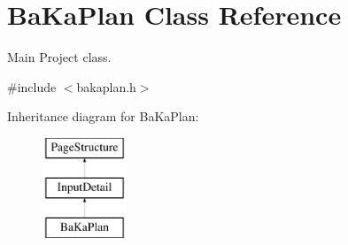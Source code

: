 \hypertarget{classBaKaPlan}{\section{Ba\-Ka\-Plan Class Reference}
\label{classBaKaPlan}
}


Main Project class.  




{\ttfamily \#include $<$bakaplan.\-h$>$}

Inheritance diagram for Ba\-Ka\-Plan\-:\begin{figure}[H]
\begin{center}
\leavevmode
\includegraphics[height=3.000000cm]{classBaKaPlan}
\end{center}
\end{figure}
